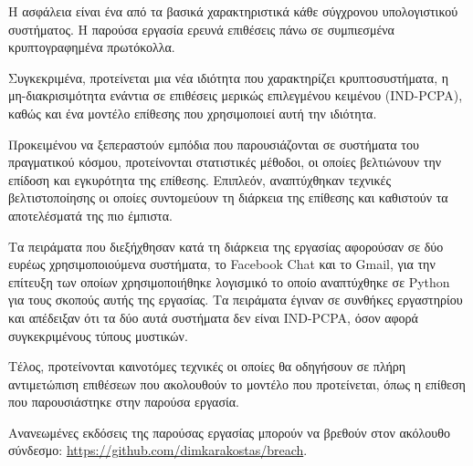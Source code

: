 \begin{abstractgr}

Η ασφάλεια είναι ένα από τα βασικά χαρακτηριστικά κάθε σύγχρονου υπολογιστικού
συστήματος. Η παρούσα εργασία ερευνά επιθέσεις πάνω σε συμπιεσμένα
κρυπτογραφημένα πρωτόκολλα.

Συγκεκριμένα, προτείνεται μια νέα ιδιότητα που χαρακτηρίζει κρυπτοσυστήματα, η
μη-διακρισιμότητα ενάντια σε επιθέσεις μερικώς επιλεγμένου κειμένου (IND-PCPA),
καθώς και ένα μοντέλο επίθεσης που χρησιμοποιεί αυτή την ιδιότητα.

Προκειμένου να ξεπεραστούν εμπόδια που παρουσιάζονται σε συστήματα του
πραγματικού κόσμου, προτείνονται στατιστικές μέθοδοι, οι οποίες βελτιώνουν την
επίδοση και εγκυρότητα της επίθεσης. Επιπλεόν, αναπτύχθηκαν τεχνικές
βελτιστοποίησης οι οποίες συντομεύουν τη διάρκεια της επίθεσης και καθιστούν τα
αποτελέσματά της πιο έμπιστα.

Τα πειράματα που διεξήχθησαν κατά τη διάρκεια της εργασίας αφορούσαν σε δύο
ευρέως χρησιμοποιούμενα συστήματα, το Facebook Chat και το Gmail, για την
επίτευξη των οποίων χρησιμοποιήθηκε λογισμικό το οποίο αναπτύχθηκε σε Python
για τους σκοπούς αυτής της εργασίας. Τα πειράματα έγιναν σε συνθήκες εργαστηρίου
και απέδειξαν ότι τα δύο αυτά συστήματα δεν είναι IND-PCPA, όσον αφορά
συγκεκριμένους τύπους μυστικών.

Τέλος, προτείνονται καινοτόμες τεχνικές οι οποίες θα οδηγήσουν σε πλήρη
αντιμετώπιση επιθέσεων που ακολουθούν το μοντέλο που προτείνεται, όπως η
επίθεση που παρουσιάστηκε στην παρούσα εργασία.

Ανανεωμένες εκδόσεις της παρούσας εργασίας μπορούν να βρεθούν στον ακόλουθο
σύνδεσμο: \url{https://github.com/dimkarakostas/breach}.

\end{abstractgr}


